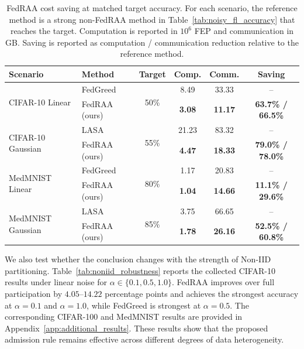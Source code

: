 \documentclass[conference]{IEEEtran}
\theoremstyle{definition}
\theoremstyle{remark}
\begin{document}
\begin{table}[!t]
\centering
\caption{FedRAA cost saving at matched target accuracy. For each scenario, the reference method is a strong non-FedRAA method in Table~\ref{tab:noisy_fl_accuracy} that reaches the target. Computation is reported in $10^6$ FEP and communication in GB. Saving is reported as computation / communication reduction relative to the reference method.}
\label{tab:efficiency_linear}
\setlength{\tabcolsep}{4.5pt}
\renewcommand{\arraystretch}{1.12}
\begin{tabular}{llcccc}
\toprule
\textbf{Scenario} & \textbf{Method} & \textbf{Target} & \textbf{Comp.} & \textbf{Comm.} & \textbf{Saving} \\
\midrule
\multirow{2}{*}{CIFAR-10 Linear} & FedGreed~\cite{kritharakis2025fedgreed} & \multirow{2}{*}{50\%} & 8.49 & 33.33 & -- \\
& FedRAA (ours) & & \textbf{3.08} & \textbf{11.17} & \textbf{63.7\% / 66.5\%} \\
\midrule
\multirow{2}{*}{CIFAR-10 Gaussian} & LASA~\cite{xu2025lasa} & \multirow{2}{*}{55\%} & 21.23 & 83.32 & -- \\
& FedRAA (ours) & & \textbf{4.47} & \textbf{18.33} & \textbf{79.0\% / 78.0\%} \\
\midrule
\multirow{2}{*}{MedMNIST Linear} & FedGreed~\cite{kritharakis2025fedgreed} & \multirow{2}{*}{80\%} & 1.17 & 20.83 & -- \\
& FedRAA (ours) & & \textbf{1.04} & \textbf{14.66} & \textbf{11.1\% / 29.6\%} \\
\midrule
\multirow{2}{*}{MedMNIST Gaussian} & LASA~\cite{xu2025lasa} & \multirow{2}{*}{85\%} & 3.75 & 66.65 & -- \\
& FedRAA (ours) & & \textbf{1.78} & \textbf{26.16} & \textbf{52.5\% / 60.8\%} \\
\bottomrule
\end{tabular}
\end{table}

We also test whether the conclusion changes with the strength of Non-IID partitioning.
Table~\ref{tab:noniid_robustness} reports the collected CIFAR-10 results under linear noise for $\alpha\in\{0.1,0.5,1.0\}$.
FedRAA improves over full participation by $4.05$--$14.22$ percentage points and achieves the strongest accuracy at $\alpha=0.1$ and $\alpha=1.0$, while FedGreed is strongest at $\alpha=0.5$.
The corresponding CIFAR-100 and MedMNIST results are provided in Appendix~\ref{app:additional_results}.
These results show that the proposed admission rule remains effective across different degrees of data heterogeneity.
\end{document}
